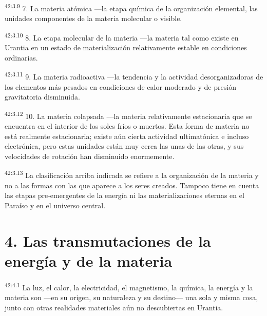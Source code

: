 \par
\textsuperscript{42:3.9} 7. La materia atómica ---la etapa química de la organización elemental, las unidades componentes de la materia molecular o visible.

\par
\textsuperscript{42:3.10} 8. La etapa molecular de la materia ---la materia tal como existe en Urantia en un estado de materialización relativamente estable en condiciones ordinarias.

\par
\textsuperscript{42:3.11} 9. La materia radioactiva ---la tendencia y la actividad desorganizadoras de los elementos más pesados en condiciones de calor moderado y de presión gravitatoria disminuida.

\par
\textsuperscript{42:3.12} 10. La materia colapsada ---la materia relativamente estacionaria que se encuentra en el interior de los soles fríos o muertos. Esta forma de materia no está realmente estacionaria; existe aún cierta actividad ultimatónica e incluso electrónica, pero estas unidades están muy cerca las unas de las otras, y sus velocidades de rotación han disminuido enormemente.

\par
\textsuperscript{42:3.13} La clasificación arriba indicada se refiere a la organización de la materia y no a las formas con las que aparece a los seres creados. Tampoco tiene en cuenta las etapas pre-emergentes de la energía ni las materializaciones eternas en el Paraíso y en el universo central.

\section*{4. Las transmutaciones de la energía y de la materia}
\par
\textsuperscript{42:4.1} La luz, el calor, la electricidad, el magnetismo, la química, la energía y la materia son ---en su origen, su naturaleza y su destino--- una sola y misma cosa, junto con otras realidades materiales aún no descubiertas en Urantia.

